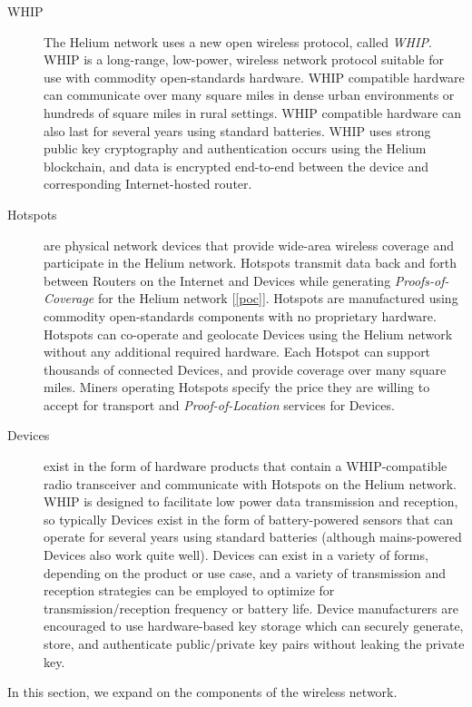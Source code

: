 \documentclass[10pt, nonatbib, nocopyrightspace, reprint]{sigplanconf}
\newcommand{\secref}[1]{[\autoref{#1}]}
\begin{document}
\begin{description}
    \item [WHIP] The Helium network uses a new open wireless protocol, called \emph{WHIP}. WHIP is a long-range, low-power, wireless network protocol suitable for use with commodity open-standards hardware. WHIP compatible hardware can communicate over many square miles in dense urban environments or hundreds of square miles in rural settings. WHIP compatible hardware can also last for several years using standard batteries. WHIP uses strong public key cryptography and authentication occurs using the Helium blockchain, and data is encrypted end-to-end between the device and corresponding Internet-hosted router.

    \item [Hotspots] are physical network devices that provide wide-area wireless coverage and participate in the Helium network. Hotspots transmit data back and forth between Routers on the Internet and Devices while generating \emph{Proofs-of-Coverage} for the Helium network \secref{poc}. Hotspots are manufactured using commodity open-standards components with no proprietary hardware. Hotspots can co-operate and geolocate Devices using the Helium network without any additional required hardware. Each Hotspot can support thousands of connected Devices, and provide coverage over many square miles. Miners operating Hotspots specify the price they are willing to accept for transport and \emph{Proof-of-Location} services for Devices.

    \item [Devices] exist in the form of hardware products that contain a WHIP-compatible radio transceiver and communicate with Hotspots on the Helium network. WHIP is designed to facilitate low power data transmission and reception, so typically Devices exist in the form of battery-powered sensors that can operate for several years using standard batteries (although mains-powered Devices also work quite well). Devices can exist in a variety of forms, depending on the product or use case, and a variety of transmission and reception strategies can be employed to optimize for transmission/reception frequency or battery life. Device manufacturers are encouraged to use hardware-based key storage which can securely generate, store, and authenticate public/private key pairs without leaking the private key.
\end{description}

In this section, we expand on the components of the wireless network.
\end{document}
